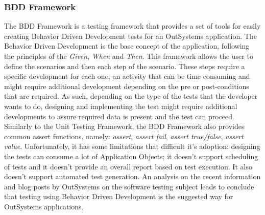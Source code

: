 \documentclass{sigchi}
\begin{document}
\subsubsection{BDD Framework}
The BDD Framework is a testing framework that provides a set of tools for easily creating Behavior Driven Development tests for an OutSystems application. The Behavior Driven Development is the base concept of the application, following the principles of the \textit{Given}, \textit{When} and \textit{Then}. This framework allows the user to define the scenarios and then each step of the scenario. These steps require a specific development for each one, an activity that can be time consuming and might require additional development depending on the pre or post-conditions that are required.
As such, depending on the type of the tests that the developer wants to do, designing and implementing the test might require additional developments to assure required data is present and the test can proceed.
Similarly to the Unit Testing Framework, the BDD Framework also provides common assert functions, namely: \textit{assert}, \textit{assert fail}, \textit{assert true/false}, \textit{assert value}. Unfortunately, it has some limitations that difficult it's adoption: designing the tests can consume a lot of Application Objects; it doesn't support scheduling of tests and it doesn't provide an overall report based on test execution. It also doesn't support automated test generation.
An analysis on the recent information and blog posts by OutSystems on the software testing subject leads to conclude that testing using Behavior Driven Development is the suggested way for OutSystems applications.
\end{document}
